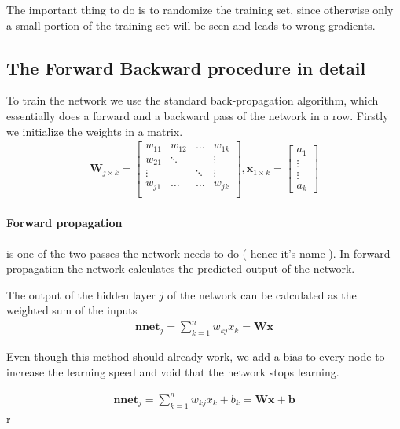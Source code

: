 \documentclass{acm_proc_article-sp}
\begin{document}
The important thing to do is to randomize the training set, since otherwise only a small portion of the training set will be seen and leads to wrong gradients.

\subsection{The Forward Backward procedure in detail}

To train the network we use the standard back-propagation algorithm, which essentially does a forward and a backward pass of the network in a row.
Firstly we initialize the weights in a matrix. 
\begin{align}
\mathbf{W}_{j \times k } = \begin{bmatrix}
w_{11} & w_{12} & \ldots & w_{1k}\\
w_{21} & \ddots & & \vdots\\
\vdots & & \ddots  & \vdots\\
w_{j1} & \ldots & \ldots  & w_{jk}\\
\end{bmatrix},
\mathbf{x}_{1 \times k} = \begin{bmatrix}
a_{1} \\
\vdots\\
\vdots \\
a_{k}
\end{bmatrix}
\end{align}


\paragraph{Forward propagation} is one of the two passes the network needs to do ( hence it's name ).
In forward propagation the network calculates the predicted output of the network.

The output of the hidden layer $j$ of the network can be calculated as the weighted sum of the inputs
\begin{align}
\mathbf{nnet}_j = \sum_{k=1}^{n}w_{kj}x_k = \mathbf{W} \mathbf{x}
\end{align}

Even though this method should already work, we add a bias to every node to increase the learning speed and void that the network stops learning.

\begin{align}
\mathbf{nnet}_j = \sum_{k=1}^{n}w_{kj}x_k + b_k = \mathbf{W} \mathbf{x} + \mathbf{b}
\end{align}r
\end{document}
